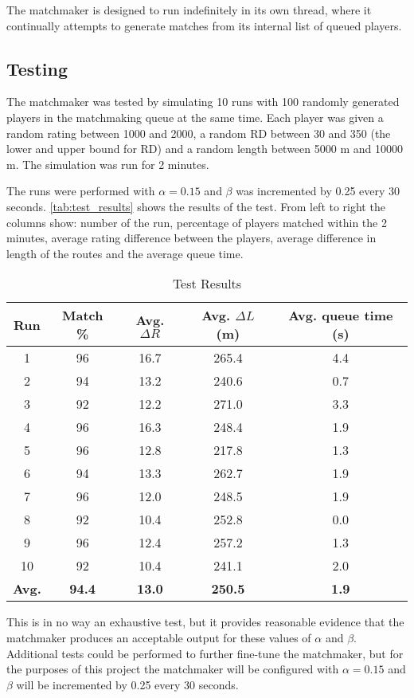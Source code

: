 The matchmaker is designed to run indefinitely in its own thread, where it continually attempts to generate matches from its internal list of queued players.

\subsection{Testing}
The matchmaker was tested by simulating 10 runs with 100 randomly generated players in the matchmaking queue at the same time.
Each player was given a random rating between 1000 and 2000, a random RD between 30 and 350 (the lower and upper bound for RD) and a random length between 5000 m and 10000 m.
The simulation was run for 2 minutes.

The runs were performed with $\alpha = 0.15$ and $\beta$ was incremented by 0.25 every 30 seconds.
\autoref{tab:test_results} shows the results of the test.
From left to right the columns show: number of the run, percentage of players matched within the 2 minutes, average rating difference between the players, average difference in length of the routes and the average queue time.

\begin{table}[!ht]
	\centering
	\begin{tabular}{c | c c c c}
		\textbf{Run}	& \textbf{Match \%}		& \textbf{Avg. $\Delta R$}		& \textbf{Avg. $\Delta L$ (m)}		& \textbf{Avg. queue time (s)} \\
		\hline
		1				& 96					& 16.7							& 265.4								& 4.4 \\
		2				& 94					& 13.2							& 240.6								& 0.7 \\
		3				& 92					& 12.2							& 271.0								& 3.3 \\
		4				& 96					& 16.3							& 248.4								& 1.9 \\
		5				& 96					& 12.8							& 217.8								& 1.3 \\
		6				& 94					& 13.3							& 262.7								& 1.9 \\
		7				& 96					& 12.0							& 248.5								& 1.9 \\
		8				& 92					& 10.4							& 252.8								& 0.0 \\
		9				& 96					& 12.4							& 257.2								& 1.3 \\
		10				& 92					& 10.4							& 241.1								& 2.0 \\
		\hline\hline
		\textbf{Avg.}	& \textbf{94.4}			& \textbf{13.0}					& \textbf{250.5}					& \textbf{1.9}
	\end{tabular}
	\caption{Test Results}
	\label{tab:test_results}
\end{table}

This is in no way an exhaustive test, but it provides reasonable evidence that the matchmaker produces an acceptable output for these values of $\alpha$ and $\beta$.
Additional tests could be performed to further fine-tune the matchmaker, but for the purposes of this project the matchmaker will be configured with $\alpha = 0.15$ and $\beta$ will be incremented by 0.25 every 30 seconds.
